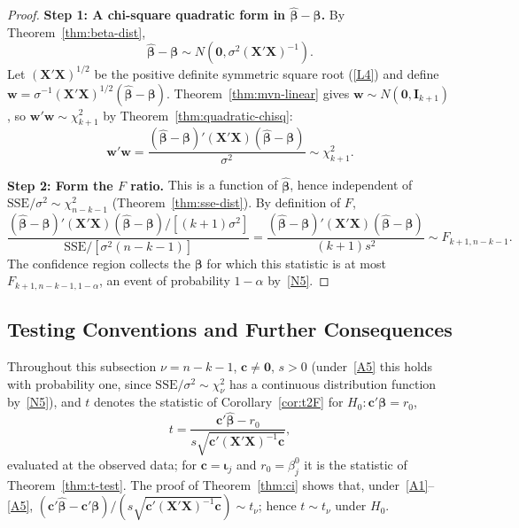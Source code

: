 \documentclass[14pt]{extarticle}
\theoremstyle{plain}
\theoremstyle{definition}
\theoremstyle{remark}
\newcommand{\SSE}{\mathrm{SSE}}
\newcommand{\bX}{\mathbf{X}}
\def\bb{\boldsymbol{\beta}}
\newcommand{\bI}{\mathbf{I}}
\def\bc{\mathbf{c}}
\newcommand{\bzero}{\mathbf{0}}
\newcommand{\bw}{\mathbf{w}}
\begin{document}
\begin{proof}
\textbf{Step 1: A chi-square quadratic form in $\hat{\bb} - \bb$.} By Theorem~\ref{thm:beta-dist},
\[
\hat{\bb} - \bb \sim N(\bzero, \sigma^2(\bX'\bX)^{-1}).
\]
Let $(\bX'\bX)^{1/2}$ be the positive definite symmetric square root (\ref{L4}) and define $\bw = \sigma^{-1}(\bX'\bX)^{1/2}(\hat{\bb} - \bb)$. Theorem~\ref{thm:mvn-linear} gives $\bw \sim N(\bzero, \bI_{k+1})$, so $\bw'\bw \sim \chi^2_{k+1}$ by Theorem~\ref{thm:quadratic-chisq}:
\[
\bw'\bw = \frac{(\hat{\bb} - \bb)'(\bX'\bX)(\hat{\bb} - \bb)}{\sigma^2} \sim \chi^2_{k+1}.
\]

\textbf{Step 2: Form the $F$ ratio.} This is a function of $\hat{\bb}$, hence independent of $\SSE/\sigma^2 \sim \chi^2_{n-k-1}$ (Theorem~\ref{thm:sse-dist}). By definition of $F$,
\[
\frac{(\hat{\bb} - \bb)'(\bX'\bX)(\hat{\bb} - \bb)/[(k+1)\sigma^2]}{\SSE/[\sigma^2(n-k-1)]} = \frac{(\hat{\bb} - \bb)'(\bX'\bX)(\hat{\bb} - \bb)}{(k+1)s^2} \sim F_{k+1, n-k-1}.
\]
The confidence region collects the $\bb$ for which this statistic is at most $F_{k+1, n-k-1, 1-\alpha}$, an event of probability $1 - \alpha$ by~\ref{N5}.
\end{proof}

\subsection{Testing Conventions and Further Consequences}\label{sec:test-more}

Throughout this subsection $\nu = n - k - 1$, $\bc \neq \bzero$, $s > 0$ (under~\ref{A5} this holds with probability one, since $\SSE/\sigma^2 \sim \chi^2_\nu$ has a continuous distribution function by~\ref{N5}), and $t$ denotes the statistic of Corollary~\ref{cor:t2F} for $H_0\colon \bc'\bb = r_0$,
\[
t = \frac{\bc'\hat{\bb} - r_0}{s\sqrt{\bc'(\bX'\bX)^{-1}\bc}},
\]
evaluated at the observed data; for $\bc = \boldsymbol\iota_j$ and $r_0 = \beta_j^0$ it is the statistic of Theorem~\ref{thm:t-test}. The proof of Theorem~\ref{thm:ci} shows that, under~\ref{A1}--\ref{A5}, $(\bc'\hat{\bb} - \bc'\bb)/(s\sqrt{\bc'(\bX'\bX)^{-1}\bc}) \sim t_\nu$; hence $t \sim t_\nu$ under $H_0$.
\end{document}
